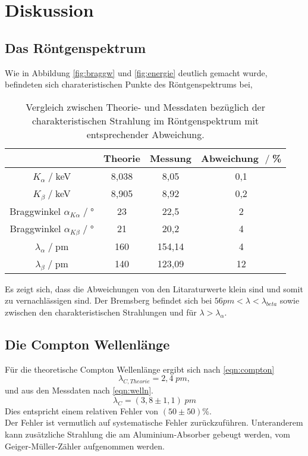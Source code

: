 \newpage
\section{Diskussion}
\subsection{Das Röntgenspektrum}
Wie in Abbildung \ref{fig:braggw} und \ref{fig:energie} deutlich gemacht wurde,
befindeten sich charateristischen Punkte des Röntgenspektrums bei,\\
\begin{table}[H]
    \centering
    \begin{tabular}{c |c c c}
        \toprule
        &Theorie \cite{literatur} & Messung & Abweichung $\;/\;$\%\\
        \midrule
        $K_{\alpha}\;/\;$keV &8,038 & 8,05&0,1\\
        $K_{\beta}\;/\;$keV &8,905 &8,92&0,2\\
        Braggwinkel $\alpha_{K \alpha}\;/\;$° &23 & 22,5&2\\
        Braggwinkel $\alpha_{K \beta}\;/\;$° &21 & 20,2&4\\
        $\lambda_{\alpha}\;/\;$pm &160 & 154,14&4\\
        $\lambda_{\beta}\;/\;$pm &140 & 123,09&12\\
        \bottomrule
    \end{tabular}
    \caption{Vergleich zwischen Theorie- und Messdaten bezüglich der
    charakteristischen Strahlung im Röntgenspektrum mit entsprechender Abweichung.}
\end{table}
Es zeigt sich, dass die Abweichungen von den Litaraturwerte klein sind 
und somit zu vernachlässigen sind. Der Bremsberg befindet sich bei $56\si{pm}<\lambda<\lambda_{beta}$ sowie
zwischen den charakteristischen Strahlungen und für $\lambda>\lambda_{\alpha}$.
\subsection{Die Compton Wellenlänge}
Für die theoretische Compton Wellenlänge ergibt sich nach \ref{eqn:compton}
\begin{equation*}
    \lambda_{C,Theorie}=2,4\;\si{pm},
\end{equation*}
und aus den Messdaten nach \ref{eqn:welln}.
\begin{equation*}
    \lambda_C=(3,8\pm1,1)\;\si{pm}
\end{equation*}
Dies entspricht einem relativen Fehler von $(50\pm50)$\%.\\
Der Fehler ist vermutlich auf systematische Fehler zurückzuführen.
Unteranderem kann zusätzliche Strahlung die am Aluminium-Absorber gebeugt werden,
vom Geiger-Müller-Zähler aufgenommen werden.\\

